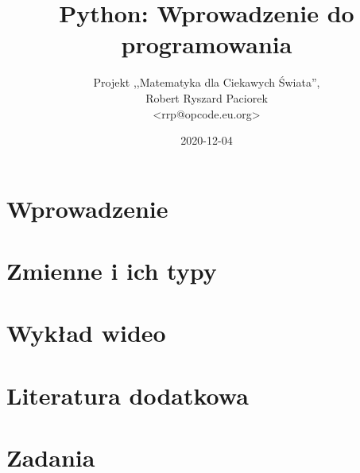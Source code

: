 \documentclass{pdfBooklets}
\title{Python: Wprowadzenie do programowania}
\author{%
	Projekt ,,Matematyka dla Ciekawych Świata'',\\
	Robert Ryszard Paciorek\\\normalsize\ttfamily <rrp@opcode.eu.org>
}
\date  {2020-12-04}
\begin{document}
\maketitle

\section{Wprowadzenie}


\student{\clearpage}

\student{\clearpage}


\student{\clearpage}
\section{Zmienne i ich typy}














\section{Wykład wideo}



\section{Literatura dodatkowa \zaawansowane{**}}


\student{\clearpage}
\section{Zadania}




\end{document}
